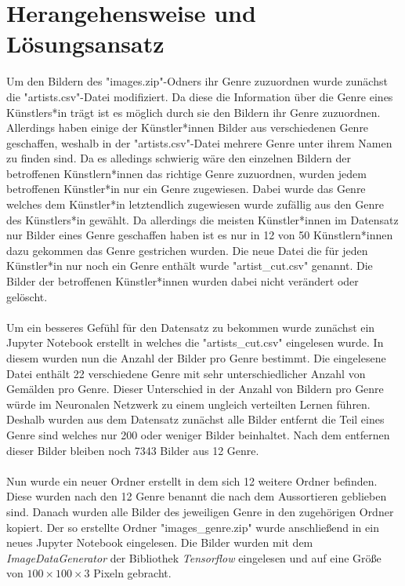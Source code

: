 \section{Herangehensweise und Lösungsansatz}
\label{sec:loesungsansatz}
Um den Bildern des "images.zip"-Odners ihr Genre zuzuordnen wurde zunächst die "artists.csv"-Datei modifiziert.
Da diese die Information über die Genre eines Künstlers*in trägt ist es möglich durch sie den Bildern ihr Genre zuzuordnen.
Allerdings haben einige der Künstler*innen Bilder aus verschiedenen Genre geschaffen, weshalb in der "artists.csv"-Datei mehrere Genre unter ihrem Namen zu finden sind.
Da es alledings schwierig wäre den einzelnen Bildern der betroffenen Künstlern*innen das richtige Genre zuzuordnen, wurden jedem betroffenen Künstler*in nur ein Genre zugewiesen.
Dabei wurde das Genre welches dem Künstler*in letztendlich zugewiesen wurde zufällig aus den Genre des Künstlers*in gewählt.
Da allerdings die meisten Künstler*innen im Datensatz nur Bilder eines Genre geschaffen haben ist es nur in 12 von 50 Künstlern*innen dazu gekommen das Genre gestrichen wurden.
Die neue Datei die für jeden Künstler*in nur noch ein Genre enthält wurde "artist\_cut.csv" genannt.
Die Bilder der betroffenen Künstler*innen wurden dabei nicht verändert oder gelöscht.
\\\\
Um ein besseres Gefühl für den Datensatz zu bekommen wurde zunächst ein Jupyter Notebook \cite{Kluyver2016jupyter} erstellt in welches die "artists\_cut.csv" eingelesen wurde.
In diesem wurden nun die Anzahl der Bilder pro Genre bestimmt.
Die eingelesene Datei enthält 22 verschiedene Genre mit sehr unterschiedlicher Anzahl von Gemälden pro Genre.
Dieser Unterschied in der Anzahl von Bildern pro Genre  würde im Neuronalen Netzwerk zu einem ungleich verteilten Lernen führen.
Deshalb wurden aus dem Datensatz zunächst alle Bilder entfernt die Teil eines Genre sind welches nur 200 oder weniger Bilder beinhaltet.
Nach dem entfernen dieser Bilder bleiben noch 7343 Bilder aus 12 Genre.
\\\\
Nun wurde ein neuer Ordner erstellt in dem sich 12 weitere Ordner befinden.
Diese wurden nach den 12 Genre benannt die nach dem Aussortieren geblieben sind.
Danach wurden alle Bilder des jeweiligen Genre in den zugehörigen Ordner kopiert.
Der so erstellte Ordner "images\_genre.zip" wurde anschließend in ein neues Jupyter Notebook eingelesen.
Die Bilder wurden mit dem \textit{ImageDataGenerator} der Bibliothek \textit{Tensorflow} \cite{tensorflow2015-whitepaper} eingelesen und auf eine Größe von $100 \times 100 \times 3$ Pixeln gebracht.
